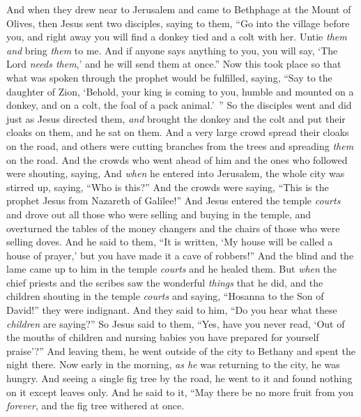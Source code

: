 \begin{biblechapter} %
 And when they drew near to Jerusalem and came to Bethphage at the Mount of Olives, then Jesus sent two disciples,
\verse saying to them, “Go into the village before you, and right away you will find a donkey tied and a colt with her. Untie \textit{them} \textit{and} bring \textit{them} to me.
\verse And if anyone says anything to you, you will say, ‘The Lord \textit{needs them},’ and he will send them at once.”
\verse Now this took place so that what was spoken through the prophet would be fulfilled, saying,
\verse “Say to the daughter of Zion, 
‘Behold, your king is coming to you, 
humble and mounted on a donkey, 
and on a colt, the foal of a pack animal.’ ”
\verse So the disciples went and did just as Jesus directed them,
\verse \textit{and} brought the donkey and the colt and put their cloaks on them, and he sat on them.
\verse And a very large crowd spread their cloaks on the road, and others were cutting branches from the trees and spreading \textit{them} on the road.
\verse And the crowds who went ahead of him and the ones who followed were shouting, saying,
\verse And \textit{when} he entered into Jerusalem, the whole city was stirred up, saying, “Who is this?”
\verse And the crowds were saying, “This is the prophet Jesus from Nazareth of Galilee!”
 And Jesus entered the temple \textit{courts} and drove out all those who were selling and buying in the temple, and overturned the tables of the money changers and the chairs of those who were selling doves.
\verse And he said to them, “It is written, ‘My house will be called a house of prayer,’ but you have made it a cave of robbers!”
\verse And the blind and the lame came up to him in the temple \textit{courts} and he healed them.
\verse But \textit{when} the chief priests and the scribes saw the wonderful \textit{things} that he did, and the children shouting in the temple \textit{courts} and saying, “Hosanna to the Son of David!” they were indignant.
\verse And they said to him, “Do you hear what these \textit{children} are saying?” So Jesus said to them, “Yes, have you never read, ‘Out of the mouths of children and nursing babies you have prepared for yourself praise’?”
\verse And leaving them, he went outside of the city to Bethany and spent the night there.
 Now early in the morning, \textit{as he} was returning to the city, he was hungry.
\verse And seeing a single fig tree by the road, he went to it and found nothing on it except leaves only. And he said to it, “May there be no more fruit from you \textit{forever}, and the fig tree withered at once.

\end{biblechapter}
